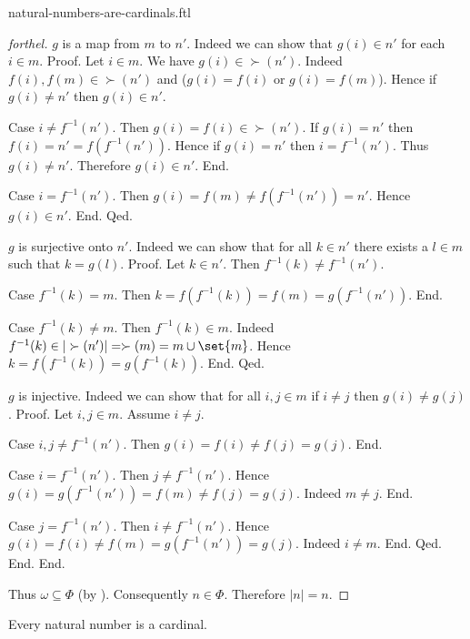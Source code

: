 \documentclass{naproche-library}
\begin{document}
\begin{smodule}{natural-numbers-are-cardinals.ftl}
\begin{proof}[forthel]
        $g$ is a map from $m$ to $n'$.
        Indeed we can show that $g(i) \in n'$ for each $i \in m$. \newline
        Proof.
          Let $i \in m$.
          We have $g(i) \in \succ(n')$.
          Indeed $f(i), f(m) \in \succ(n')$ and ($g(i) = f(i)$ or $g(i) = f(m)$).
          Hence if $g(i) \neq n'$ then $g(i) \in n'$.

          Case $i \neq f^{-1}(n')$.
            Then $g(i) = f(i) \in \succ(n')$.
            If $g(i) = n'$ then $f(i) = n' = f(f^{-1}(n'))$.
            Hence if $g(i) = n'$ then $i = f^{-1}(n')$.
            Thus $g(i) \neq n'$.
            Therefore $g(i) \in n'$.
          End.

          Case $i = f^{-1}(n')$.
            Then $g(i)
              = f(m)
              \neq f(f^{-1}(n'))
              = n'$.
            Hence $g(i) \in n'$.
          End.
        Qed.

        $g$ is surjective onto $n'$.
        Indeed we can show that for all $k \in n'$ there exists a $l \in m$ such that $k = g(l)$. \newline
        Proof.
          Let $k \in n'$.
          Then $f^{-1}(k) \neq f^{-1}(n')$.

          Case $f^{-1}(k) = m$.
            Then $k
              = f(f^{-1}(k))
              = f(m)
              = g(f^{-1}(n'))$.
          End.

          Case $f^{-1}(k) \neq m$.
            Then $f^{-1}(k) \in m$.
            Indeed $f^{-1}(k) \in |\succ(n')| = \succ(m) = m \cup \set{m}$.
            Hence $k
              = f(f^{-1}(k))
              = g(f^{-1}(k))$.
          End.
        Qed.

        $g$ is injective.
        Indeed we can show that for all $i, j \in m$ if $i \neq j$ then $g(i) \neq g(j)$. \newline
        Proof.
          Let $i, j \in m$.
          Assume $i \neq j$.

          Case $i, j \neq f^{-1}(n')$.
            Then $g(i)
              = f(i)
              \neq f(j)
              = g(j)$.
          End.

          Case $i = f^{-1}(n')$.
            Then $j \neq f^{-1}(n')$.
            Hence $g(i)
              = g(f^{-1}(n'))
              = f(m)
              \neq f(j)
              = g(j)$.
            Indeed $m \neq j$.
          End.

          Case $j = f^{-1}(n')$.
            Then $i \neq f^{-1}(n')$.
            Hence $g(i)
              = f(i)
              \neq f(m)
              = g(f^{-1}(n'))
              = g(j)$.
            Indeed $i \neq m$.
          End.
        Qed.
      End.
    End.

    Thus $\omega \subseteq \Phi$ (by ).
    Consequently $n \in \Phi$.
    Therefore $|n| = n$.
  \end{proof}

  \begin{corollary}[forthel,id=SET_THEORY_07_7061392098066432]
    Every natural number is a cardinal.
  \end{corollary}
\end{smodule}
\end{document}
